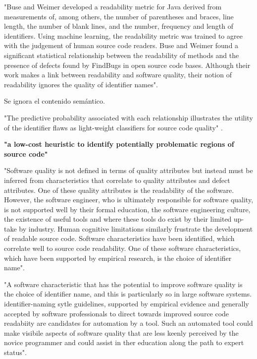 "Buse and Weimer \cite{Buse2008} developed a readability metric for Java derived from measurements 
of, among others, the number of parentheses and braces, line length, the number
of blank lines, and the number, frequency and length of identifiers.
Using machine learning, the readability metric was trained to agree with the judgement 
of human source code readers.
Buse and Weimer found a significant statistical relationship between the readability of 
methods and the presence of defects found by FindBugs in open source code bases. 
Although their work makes a link between readability and software quality, their notion
of readability ignores the quality of identifier names".

Se ignora el contenido semántico.

"The predictive probability associated with each relationship illustrates the utility
of the identifier flaws as light-weight classifiers for source code quality"
\cite{ButlerWemelingerYu10}.

\textbf{"a low-cost heuristic to identify potentially problematic regions of source code"}

"Software quality is not defined in terms of quality attributes but instead must be
inferred from characteristics that correlate to quality attributes and defect attributes.
One of these quality attributes is the readability of the software.
However, the software engineer, who is ultimately responsible for software quality,
is not supported well by their formal education, the software engineering culture, the
existence of useful tools and where these tools do exist by their limited up-take by industry.
Human cognitive limitations similarly frustrate the development of readable source code.
Software characteristics have been identified, which correlate well to source code readability.
One of these software characteristics, which have been supported by empirical research,
is the choice of identifier name".\cite{Relf04}

"A software characteristic that has the potential to improve software quality is the choice of
identifier name, and this is particularly so in large software systems.
identifier-naming sytle guidelines, supported by empirical evidence and generally accepted by
software professionals to direct towards improved source code readabiity are candidates for
automation by a tool.
Such an automated tool could make visibile aspects of software quality that are less keenly
perceived by the novice programmer and could assist in ther education along the path to
expert status"\cite{Relf04}.

